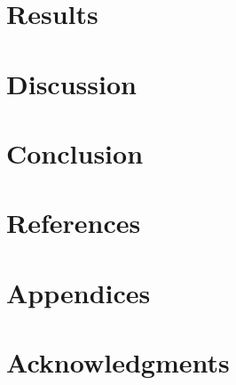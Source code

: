 \documentclass{article}
\begin{document}
\newpage
\section{Results}

\newpage
\section{Discussion}

\newpage
\section{Conclusion}

\newpage
\section{References}

\section{Appendices}

\section{Acknowledgments}
\end{document}
